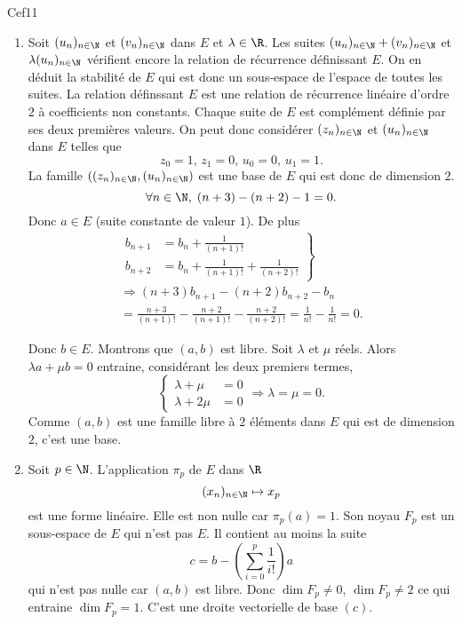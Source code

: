 \begin{tiny}Cef11\end{tiny}
\begin{enumerate}
  \item Soit $(u_n)_{n\in \N}$ et $(v_n)_{n\in \N}$ dans $E$ et $\lambda \in \R$. Les suites $(u_n)_{n\in \N} + (v_n)_{n\in \N}$ et $\lambda(u_n)_{n\in \N}$ vérifient encore la relation de récurrence définissant $E$. On en déduit la stabilité de $E$ qui est donc un sous-espace de l'espace de toutes les suites.\newline
  La relation définssant $E$ est une relation de récurrence linéaire d'ordre $2$ à coefficients non constants. Chaque suite de $E$ est complément définie par ses deux premières valeurs. On peut donc considérer $(z_n)_{n\in \N}$ et $(u_n)_{n\in \N}$ dans $E$ telles que 
\[
  z_0 = 1, \, z_1 = 0, \, u_0 = 0, \, u_1 = 1.
\]
La famille $\left((z_n)_{n\in \N},(u_n)_{n\in \N}\right)$ est une base de $E$ qui est donc de dimension $2$.
\[
  \forall n \in \N, \; (n+3) - (n+2) -1 =0.
\]
Donc $a\in E$ (suite constante de valeur $1$). De plus
\begin{multline*}
  \left.
  \begin{aligned}
    b_{n+1} &= b_n + \frac{1}{(n+1)!} \\ b_{n+2} &= b_n + \frac{1}{(n+1)!} + \frac{1}{(n+2)!}
  \end{aligned}
\right\rbrace \\
\Rightarrow
(n+3)b_{n+1} -(n+2)b_{n+2} - b_n \\
= \frac{n+3}{(n+1)!} - \frac{n+2}{(n+1)!} -\frac{n+2}{(n+2)!}
= \frac{1}{n!} - \frac{1}{n!} = 0 .
\end{multline*}

Donc $b \in E$. Montrons que $(a,b)$ est libre. Soit $\lambda$ et $\mu$ réels. Alors $\lambda a + \mu b = 0$ entraine, considérant les deux premiers termes,
\[
  \left\lbrace
  \begin{aligned}
    \lambda + \mu &= 0 \\ \lambda + 2\mu &= 0
  \end{aligned}
\right.
\Rightarrow \lambda = \mu = 0.
\]
Comme $(a,b)$ est une famille libre à $2$ éléments dans $E$ qui est de dimension $2$, c'est une base.
  \item Soit $p \in \N$. L'application $\pi_p$ de $E$ dans $\R$
  \[
    (x_n)_{n\in \N} \mapsto x_p
  \]
est une forme linéaire. Elle est non nulle car $\pi_p(a) = 1$. Son noyau $F_p$ est un sous-espace de $E$ qui n'est pas $E$. Il contient au moins la suite 
\[
  c = b - \left(\sum_{i=0}^p\frac{1}{i!}\right)a
\]
qui n'est pas nulle car $(a,b)$ est libre. Donc $\dim F_p \neq 0$, $\dim F_p \neq 2$ ce qui entraine $\dim F_p = 1$. C'est une droite vectorielle de base $(c)$. 
\end{enumerate}
